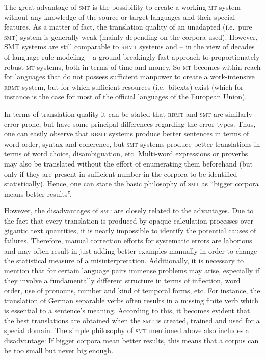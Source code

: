 \documentclass[output=paper]{LSP/langsci}
\begin{document}
The great advantage of \textsc{smt} is the possibility to create a working \textsc{mt} system without any knowledge of the source or target languages and their special features. As a matter of fact, the translation quality of an unadapted (i.e.\ pure \textsc{smt}) system is generally weak (mainly depending on the corpora used). However, \textsc{SMT} systems are still comparable to \textsc{rbmt} systems and -- in the view of decades of language rule modeling -- a ground-breakingly fast approach to proportionately robust \textsc{mt} systems, both in terms of time and money. So \textsc{mt} becomes within reach for languages that do not possess sufficient manpower to create a work-intensive \textsc{rbmt} system, but for which sufficient resources (i.e.\ bitexts) exist (which for instance is the case for most of the official languages of the European Union).

In terms of translation quality it can be stated that \textsc{rbmt} and \textsc{smt} are similarly error-prone, but have some principal differences regarding the error types. Thus, one can easily observe that \textsc{rbmt} systems produce better sentences in terms of word order, syntax and coherence, but \textsc{smt} systems produce better translations in terms of word choice, disambiguation, etc. Multi-word expressions or proverbs may also be translated without the effort of enumerating them beforehand (but only if they are present in sufficient number in the corpora to be identified statistically). Hence, one can state the basic philosophy of \textsc{smt} as ``bigger corpora means better results''.

However, the disadvantages of \textsc{smt} are closely related to the advantages. Due to the fact that every translation is produced by opaque calculation processes over gigantic text quantities, it is nearly impossible to identify the potential causes of failures. Therefore, manual correction efforts for systematic errors are laborious and may often result in just adding better examples manually in order to change the statistical measure of a misinterpretation. Additionally, it is necessary to mention that for certain language pairs immense problems may arise, especially if they involve a fundamentally different structure in terms of inflection, word order, use of pronouns, number and kind of temporal forms, etc. For instance, the translation of German separable verbs often results in a missing finite verb which is essential to a sentence's meaning. According to this, it becomes evident that the best translations are obtained when the \textsc{smt} is created, trained and used for a special domain. The simple philosophy of \textsc{smt} mentioned above also includes a disadvantage: If bigger corpora mean better results, this means that a corpus can be too small but never big enough.
\end{document}
